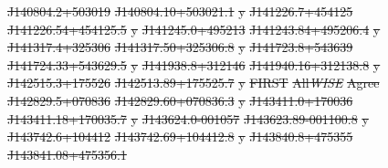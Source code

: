 \documentclass[11pt, a4paper]{book}
\providecommand{\DIFdeltex}[1]{{\protect\color{red}\sout{#1}}}                      %
\providecommand{\DIFdelFL}[1]{\DIFdel{#1}} %
\providecommand{\DIFdel}[1]{\texorpdfstring{\DIFdeltex{#1}}{}} %
\begin{document}
\DIFdelFL{J140804.2+503019 }%
\DIFdelFL{J140804.10+503021.1 }%
\DIFdelFL{y}%
\DIFdelFL{J141226.7+454125 }%
\DIFdelFL{J141226.54+454125.5 }%
\DIFdelFL{y}%
\DIFdelFL{J141245.0+495213 }%
\DIFdelFL{J141243.84+495206.4 }%
\DIFdelFL{y}%
\DIFdelFL{J141317.4+325306 }%
\DIFdelFL{J141317.50+325306.8 }%
\DIFdelFL{y}%
\DIFdelFL{J141723.8+543639 }%
\DIFdelFL{J141724.33+543629.5 }%
\DIFdelFL{y}%
\DIFdelFL{J141938.8+312146 }%
\DIFdelFL{J141940.16+312138.8 }%
\DIFdelFL{y}%
\DIFdelFL{J142515.3+175526 }%
\DIFdelFL{J142513.89+175525.7 }%
\DIFdelFL{y}%
\DIFdelFL{FIRST }%
\DIFdelFL{All}\emph{\DIFdelFL{WISE}} %
\DIFdelFL{Agree}%
\DIFdelFL{J142829.5+070836 }%
\DIFdelFL{J142829.60+070836.3 }%
\DIFdelFL{y}%
\DIFdelFL{J143411.0+170036 }%
\DIFdelFL{J143411.18+170035.7 }%
\DIFdelFL{y}%
\DIFdelFL{J143624.0-001057 }%
\DIFdelFL{J143623.89-001100.8 }%
\DIFdelFL{y}%
\DIFdelFL{J143742.6+104412 }%
\DIFdelFL{J143742.69+104412.8 }%
\DIFdelFL{y}%
\DIFdelFL{J143840.8+475355 }%
\DIFdelFL{J143841.08+475356.1 }%
\end{document}
